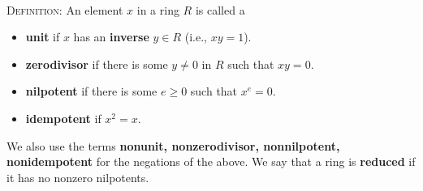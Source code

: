 \documentclass[12pt]{amsart}
\begin{document}
\begin{framed}



\


\textsc{Definition:} An element $x$ in a ring $R$ is called a
\begin{itemize}
\item \textbf{unit} if $x$ has an \textbf{inverse} $y\in R$ (i.e., $xy=1$).
\item \textbf{zerodivisor} if there is some $y\neq 0$ in $R$ such that $xy=0$.
\item \textbf{nilpotent} if there is some $e\geq 0$ such that $x^e=0$.
\item \textbf{idempotent} if $x^2 = x$.
\end{itemize}
We also use the terms \textbf{nonunit, nonzerodivisor, nonnilpotent, nonidempotent} for the negations of the above.
We say that a ring is \textbf{reduced} if it has no nonzero nilpotents.
\end{framed}
\end{document}
